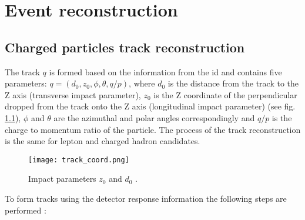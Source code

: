 \chapter{Event reconstruction}
    
    
    \section{Charged particles track reconstruction}
    \label{sec::tracking}
    The track $q$ is formed based on the information from the \gls{id} and contains five parameters: $q = (d_0,z_0,\phi,\theta,q/p)$, where $d_0$ is the distance from the track to the Z axis (transverse impact parameter), $z_0$ is the Z coordinate of the perpendicular dropped from the track onto the Z axis (longitudinal impact parameter) (see fig. \ref{fig::z0d0}), $\phi$ and $\theta$ are the azimuthal and polar angles correspondingly and $q/p$ is the charge to momentum ratio of the particle. The process of the track reconstruction is the same for lepton and charged hadron candidates. \\
        	\begin{figure}[htbp]
        		\centering
    		\texttt{[image: track\_coord.png]}
    		\caption[Impact parameters]{Impact parameters $z_0$ and $d_0$ \cite{ATLAS:track}.}
    		\label{fig::z0d0}
  			 \end{figure}
  	To form tracks using the detector response information the following steps are performed \cite{ATLAS:track2}:
